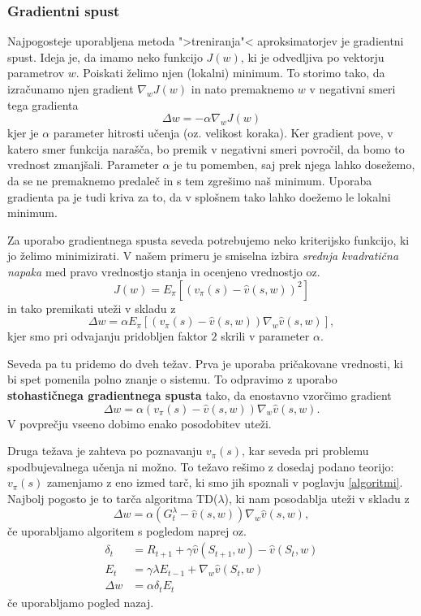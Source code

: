 \documentclass[12pt,a4paper]{amsart}
\theoremstyle{definition} %
\theoremstyle{plain} %
\begin{document}
\subsubsection{Gradientni spust}
Najpogosteje uporabljena metoda ">treniranja"< aproksimatorjev je gradientni spust. Ideja je, da 
imamo neko funkcijo $J(w)$, ki je odvedljiva po vektorju parametrov $w$. Poiskati želimo njen 
(lokalni) minimum. To storimo tako, da izračunamo njen gradient $\nabla_wJ(w)$ in nato premaknemo $w$
v negativni smeri tega gradienta
$$
\Delta w = - \alpha \nabla_wJ(w)
$$
kjer je $\alpha$ parameter hitrosti učenja (oz. velikost koraka). Ker gradient pove, v katero smer 
funkcija narašča, bo premik v negativni smeri povročil, da bomo to vrednost zmanjšali. Parameter 
$\alpha$ je tu pomemben, saj prek njega lahko dosežemo, da se ne premaknemo predaleč in s tem zgrešimo
naš minimum. Uporaba gradienta pa je tudi kriva za to, da v splošnem tako lahko doežemo le lokalni 
minimum. 

Za uporabo gradientnega spusta seveda potrebujemo neko kriterijsko funkcijo, ki jo želimo minimizirati. 
V našem primeru je smiselna izbira \textit{srednja kvadratična napaka} med pravo vrednostjo stanja in 
ocenjeno vrednostjo oz. 
$$
J(w) = E_\pi [(v_\pi(s) - \hat{v}(s, w))^2]
$$
in tako premikati uteži v skladu z 
$$
\Delta w = \alpha E_\pi [(v_\pi(s) - \hat{v}(s, w)) \nabla_w \hat{v}(s, w)], 
$$
kjer smo pri odvajanju pridobljen faktor $2$ skrili v parameter $\alpha$.

Seveda pa tu pridemo do dveh težav. Prva je uporaba pričakovane vrednosti, ki bi spet pomenila polno 
znanje o sistemu. To odpravimo z uporabo \textbf{stohastičnega gradientnega spusta} tako, da 
enostavno vzorčimo gradient 
$$
\Delta w = \alpha (v_\pi(s) - \hat{v}(s, w)) \nabla_w \hat{v}(s, w). 
$$
V povprečju vseeno dobimo enako posodobitev uteži. 

Druga težava je zahteva po poznavanju $v_\pi(s)$, kar seveda pri problemu spodbujevalnega učenja ni 
možno. To težavo rešimo z dosedaj podano teorijo: $v_\pi(s)$ zamenjamo z eno izmed tarč, ki smo jih 
spoznali v poglavju \ref{algoritmi}. Najbolj pogosto je to tarča algoritma TD($\lambda$), ki nam 
posodablja uteži v skladu z 
$$
\Delta w = \alpha (G_t^\lambda - \hat{v}(s, w)) \nabla_w \hat{v}(s, w), 
$$
če uporabljamo algoritem s pogledom naprej oz. 
\begin{align*}
    \delta_t &= R_{t+1} + \gamma \hat{v}(S_{t+1}, w) - \hat{v}(S_t, w) \\
    E_t &= \gamma \lambda E_{t-1} + \nabla_w \hat{v}(S_t, w) \\
    \Delta w &= \alpha \delta_t E_t
\end{align*}
če uporabljamo pogled nazaj.
\end{document}
